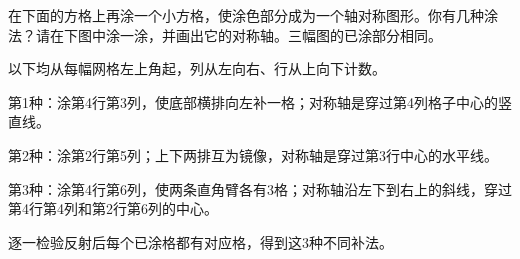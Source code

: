 在下面的方格上再涂一个小方格，使涂色部分成为一个轴对称图形。你有几种涂法？请在下图中涂一涂，并画出它的对称轴。三幅图的已涂部分相同。\par
{}
\begin{BookAnswer}
以下均从每幅网格左上角起，列从左向右、行从上向下计数。\par 第1种：涂第4行第3列，使底部横排向左补一格；对称轴是穿过第4列格子中心的竖直线。\par 第2种：涂第2行第5列；上下两排互为镜像，对称轴是穿过第3行中心的水平线。\par 第3种：涂第4行第6列，使两条直角臂各有3格；对称轴沿左下到右上的斜线，穿过第4行第4列和第2行第6列的中心。\par 逐一检验反射后每个已涂格都有对应格，得到这3种不同补法。
\end{BookAnswer}
